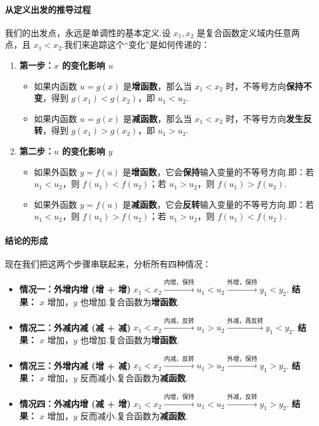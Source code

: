 \paragraph{从定义出发的推导过程}
我们的出发点，永远是单调性的基本定义.设 $x_1, x_2$ 是复合函数定义域内任意两点，且 $x_1 < x_2$.我们来追踪这个“变化”是如何传递的：
\begin{enumerate}
	\item \textbf{第一步：$x$ 的变化影响 $u$}
	\begin{itemize}
		\item 如果内函数 $u=g(x)$ 是\textbf{增函数}，那么当 $x_1 < x_2$ 时，不等号方向\textbf{保持不变}，得到 $g(x_1) < g(x_2)$，即 $u_1 < u_2$.
		\item 如果内函数 $u=g(x)$ 是\textbf{减函数}，那么当 $x_1 < x_2$ 时，不等号方向\textbf{发生反转}，得到 $g(x_1) > g(x_2)$，即 $u_1 > u_2$.
	\end{itemize}
	\item \textbf{第二步：$u$ 的变化影响 $y$}
	\begin{itemize}
		\item 如果外函数 $y=f(u)$ 是\textbf{增函数}，它会\textbf{保持}输入变量的不等号方向.即：若 $u_1 < u_2$，则 $f(u_1) < f(u_2)$；若 $u_1 > u_2$，则 $f(u_1) > f(u_2)$.
		\item 如果外函数 $y=f(u)$ 是\textbf{减函数}，它会\textbf{反转}输入变量的不等号方向.即：若 $u_1 < u_2$，则 $f(u_1) > f(u_2)$；若 $u_1 > u_2$，则 $f(u_1) < f(u_2)$.
	\end{itemize}
\end{enumerate}

\paragraph{结论的形成}
现在我们把这两个步骤串联起来，分析所有四种情况：
\begin{itemize}
	\item \textbf{情况一：外增内增 (增 + 增)}
	$x_1 < x_2 \xrightarrow{\text{内增，保持}} u_1 < u_2 \xrightarrow{\text{外增，保持}} y_1 < y_2$.
	\textbf{结果：} $x$ 增加，$y$ 也增加.复合函数为\textbf{增函数}.
	
	\item \textbf{情况二：外减内减 (减 + 减)}
	$x_1 < x_2 \xrightarrow{\text{内减，反转}} u_1 > u_2 \xrightarrow{\text{外减，再反转}} y_1 < y_2$.
	\textbf{结果：} $x$ 增加，$y$ 也增加.复合函数为\textbf{增函数}.
	
	\item \textbf{情况三：外增内减 (增 + 减)}
	$x_1 < x_2 \xrightarrow{\text{内减，反转}} u_1 > u_2 \xrightarrow{\text{外增，保持}} y_1 > y_2$.
	\textbf{结果：} $x$ 增加，$y$ 反而减小.复合函数为\textbf{减函数}.
	
	\item \textbf{情况四：外减内增 (减 + 增)}
	$x_1 < x_2 \xrightarrow{\text{内增，保持}} u_1 < u_2 \xrightarrow{\text{外减，反转}} y_1 > y_2$.
	\textbf{结果：} $x$ 增加，$y$ 反而减小.复合函数为\textbf{减函数}.
\end{itemize}

